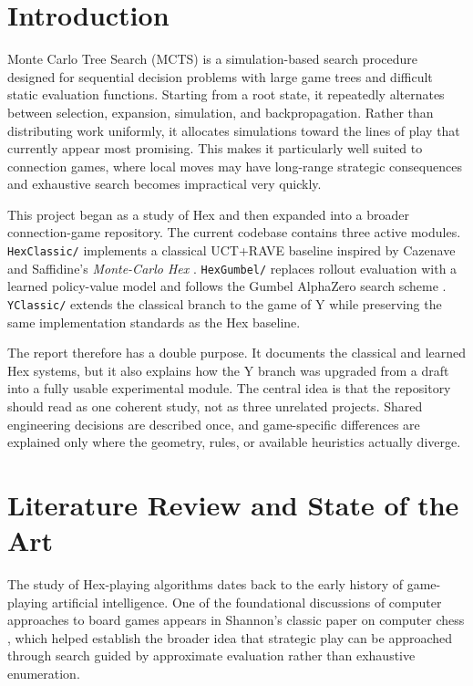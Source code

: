 \documentclass[11pt,a4paper]{article}
\begin{document}
\section{Introduction}

Monte Carlo Tree Search (MCTS) is a simulation-based search procedure designed
for sequential decision problems with large game trees and difficult static
evaluation functions. Starting from a root state, it repeatedly alternates
between selection, expansion, simulation, and backpropagation. Rather than
distributing work uniformly, it allocates simulations toward the lines of play
that currently appear most promising. This makes it particularly well suited to
connection games, where local moves may have long-range strategic
consequences and exhaustive search becomes impractical very quickly.

This project began as a study of Hex and then expanded into a broader
connection-game repository. The current codebase contains three active modules.
\texttt{HexClassic/} implements a classical UCT+RAVE baseline inspired by
Cazenave and Saffidine's \emph{Monte-Carlo Hex} \cite{cazenave2010montecarlohex}.
\texttt{HexGumbel/} replaces rollout evaluation with a learned policy-value
model and follows the Gumbel AlphaZero search scheme
\cite{danihelka2022gumbel}. \texttt{YClassic/} extends the classical branch to
the game of Y while preserving the same implementation standards as the Hex
baseline.

The report therefore has a double purpose. It documents the classical and
learned Hex systems, but it also explains how the Y branch was upgraded from a
draft into a fully usable experimental module. The central idea is that the
repository should read as one coherent study, not as three unrelated projects.
Shared engineering decisions are described once, and game-specific differences
are explained only where the geometry, rules, or available heuristics actually
diverge.

\section{Literature Review and State of the Art}

The study of Hex-playing algorithms dates back to the early history of
game-playing artificial intelligence. One of the foundational discussions of
computer approaches to board games appears in Shannon's classic paper on
computer chess \cite{shannon1950chess}, which helped establish the broader idea
that strategic play can be approached through search guided by approximate
evaluation rather than exhaustive enumeration.
\end{document}
